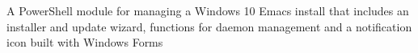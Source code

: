 A PowerShell module for managing a Windows 10 Emacs install that includes an
installer and update wizard, functions for daemon management and a notification
icon built with Windows Forms
